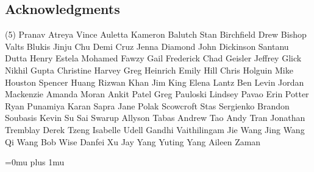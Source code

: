 \documentclass{llmxive}
\providecommand{\bibsection}{  \par\noindent{\headingfont\refname}\par\vspace{5pt}}
\providecommand{\headingfont}{\bfseries\fontsize{13}{14}\selectfont}
\providecommand{\refname}{References}
\begin{document}
\subsection{Acknowledgments}
\begingroup
\footnotesize
\begin{tasks}[label=\relax, label-width=0pt, item-indent=4pt](5)
\task Pranav Atreya
\task Vince Auletta
\task Kameron Balutch
\task Stan Birchfield
\task Drew Bishop
\task Valts Blukis
\task Jinju Chu
\task Demi Cruz
\task Jenna Diamond
\task John Dickinson
\task Santanu Dutta
\task Henry Estela
\task Mohamed Fawzy
\task Gail Frederick
\task Chad Geisler
\task Jeffrey Glick
\task Nikhil Gupta
\task Christine Harvey
\task Greg Heinrich
\task Emily Hill
\task Chris Holguin
\task Mike Houston
\task Spencer Huang
\task Rizwan Khan
\task Jim King
\task Elena Lantz
\task Ben Levin
\task Jordan Mackenzie
\task Amanda Moran
\task Ankit Patel
\task Greg Pauloski
\task Lindsey Pavao
\task Erin Potter
\task Ryan Punamiya 
\task Karan Sapra 
\task Jane Polak Scowcroft
\task Stas Sergienko
\task Brandon Soubasis
\task Kevin Su
\task Sai Swarup
\task Allyson Tabas
\task Andrew Tao 
\task Andy Tran
\task Jonathan Tremblay
\task Derek Tzeng
\task Isabelle Udell
\task Gandhi Vaithilingam
\task Jie Wang
\task Jing Wang
\task Qi Wang
\task Bob Wise
\task Danfei Xu 
\task Jay Yang
\task Yuting Yang
\task Aileen Zaman
\end{tasks}
\endgroup



\begingroup

\sloppy
\makeatletter
\renewcommand{\bibsection}{%
  \par\noindent{\headingfont\refname}\par\vspace{5pt}%
}
\setlength{\bibhang}{0pt}
\renewcommand\@bibsetup[1]{%
  \setlength{\itemindent}{0pt}%
  \setlength{\labelwidth}{0pt}%
  \setlength{\labelsep}{0pt}%
  \setlength{\listparindent}{0pt}%
  \setlength{\itemsep}{\bibsep}%
  \setlength{\parsep}{\z@}%
}
\makeatother
\setlength{\emergencystretch}{3em}
\Urlmuskip=0mu plus 1mu\relax


\endgroup
\end{document}
